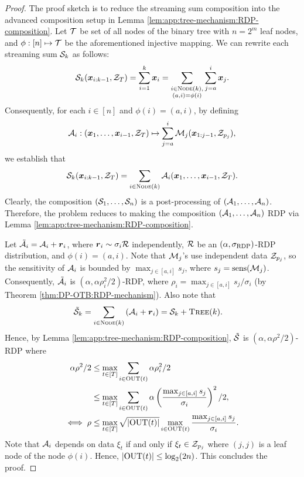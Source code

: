 \begin{proof}
The proof sketch is to reduce the streaming sum composition into the advanced composition setup in Lemma \ref{lem:app:tree-mechanism:RDP-composition}.
Let ${{\mathcal{T}}}$ be set of all nodes of the binary tree with $n=2^m$ leaf nodes, and $\phi:[n]\mapsto {{\mathcal{T}}}$ be the aforementioned injective mapping. We can rewrite each streaming sum ${\cal S}_k$ as follows:
\begin{align*}
    {\cal S}_k({\boldsymbol{x}}_{i:k-1},{\cal Z}_T) = \sum_{i=1}^k {\boldsymbol{x}}_i = \sum_{\substack{i\in{\normalfont\textsc{Node}}(k),\\(a,i)=\phi(i)}} \sum_{j=a}^i {\boldsymbol{x}}_j.
\end{align*}
Consequently, for each $i\in[n]$ and $\phi(i)=(a,i)$, by defining 
\begin{align*}
    {\cal A}_i:({\boldsymbol{x}}_1,\ldots,{\boldsymbol{x}}_{i-1},{\cal Z}_T) \mapsto \sum_{j=a}^i {\cal M}_j({\boldsymbol{x}}_{1:j-1},{\cal Z}_{p_j}),
\end{align*}
we establish that 
\begin{align*}
    {\cal S}_k({\boldsymbol{x}}_{i:k-1},{\cal Z}_T) = \sum_{i\in{\normalfont\textsc{Node}}(k)} {\cal A}_i({\boldsymbol{x}}_1,\ldots,{\boldsymbol{x}}_{i-1},{\cal Z}_T).
\end{align*}
Clearly, the composition $({\cal S}_1,\ldots,{\cal S}_n)$ is a post-processing of $({\cal A}_1,\ldots,{\cal A}_n)$. Therefore, the problem reduces to making the composition $({\cal A}_1,\ldots,{\cal A}_n)$ RDP via Lemma \ref{lem:app:tree-mechanism:RDP-composition}.

Let $\tilde{{\cal A}}_i = {\cal A}_i + {\boldsymbol{r}}_i$, where ${\boldsymbol{r}}_i\sim \sigma_i{\cal R}$ independently, ${\cal R}$ be an $(\alpha,\sigma_{\mathrm{RDP}})$-RDP distribution, and $\phi(i)=(a,i)$. Note that ${\cal M}_j$'s use independent data ${\cal Z}_{p_j}$, so the sensitivity of ${\cal A}_i$ is bounded by $\max_{j\in [a,i]} s_j$, where $s_j=\operatorname{sens}({\cal M}_j)$. Consequently, $\tilde{{\cal A}}_i$ is $(\alpha,\alpha\rho_i^2/2)$-RDP, where $\rho_i = \max_{j\in [a,i]}s_j / \sigma_i$ (by Theorem \ref{thm:DP-OTB:RDP-mechanism}). Also note that 
\begin{align*}
    \tilde{{\cal S}}_k 
    &= \sum_{i\in{\normalfont\textsc{Node}}(k)} \left({\cal A}_i + {\boldsymbol{r}}_i\right) 
    = {\cal S}_k + {\normalfont\textsc{Tree}}(k).
\end{align*}
Hence, by Lemma \ref{lem:app:tree-mechanism:RDP-composition}, $\tilde{{\cal S}}$ is $(\alpha,\alpha\rho^2/2)$-RDP where
\begin{align*}
    \alpha\rho^2/2 
    &\le \max_{t\in[T]}\sum_{i\in \mathrm{OUT}(t)} \alpha\rho_i^2/2 \\
    &\le \max_{t\in[T]}\sum_{i\in \mathrm{OUT}(t)} \alpha \left(\frac{\max_{j\in [a,i]}s_j}{\sigma_i}\right)^2 /2, \\
    \iff \rho 
    &\le \max_{t\in[T]} \sqrt{|\mathrm{OUT}(t)|} \max_{i\in\mathrm{OUT}(t)} \frac{\max_{j\in [a,i]}s_j}{\sigma_i}.
\end{align*}
Note that ${\cal A}_i$ depends on data $\xi_t$ if and only if $\xi_t\in{\cal Z}_{p_j}$ where $(j,j)$ is a leaf node of the node $\phi(i)$. Hence, $|\mathrm{OUT}(t)|\le \log_2(2n)$. This concludes the proof.
\end{proof}


